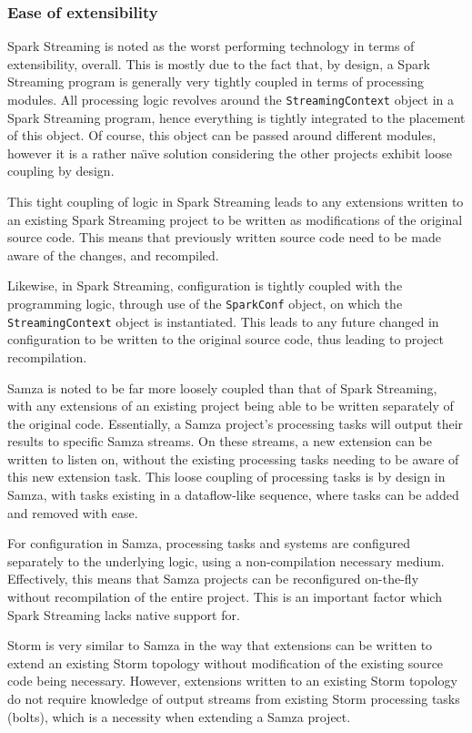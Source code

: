 \subsubsection{Ease of extensibility}

Spark Streaming is noted as the worst performing technology in terms of extensibility, overall. This is mostly due to
the fact that, by design, a Spark Streaming program is generally very tightly coupled in terms of processing modules.
All processing logic revolves around the \texttt{StreamingContext} object in a Spark Streaming program, hence everything is
tightly integrated to the placement of this object. Of course, this object can be passed around different modules, however
it is a rather na\"{\i}ve solution considering the other projects exhibit loose coupling by design.

This tight coupling of logic in Spark Streaming leads to any extensions written to an existing Spark Streaming project to
be written as modifications of the original source code. This means that previously written source code need to be made
aware of the changes, and recompiled.

Likewise, in Spark Streaming, configuration is tightly coupled with the programming logic, through use of the \texttt{SparkConf}
object, on which the \texttt{StreamingContext} object is instantiated. This leads to any future changed in configuration to be
written to the original source code, thus leading to project recompilation.

Samza is noted to be far more loosely coupled than that of Spark Streaming, with any extensions of an existing project
being able to be written separately of the original code. Essentially, a Samza project's processing tasks will output
their results to specific Samza streams. On these streams, a new extension can be written to listen on, without the
existing processing tasks needing to be aware of this new extension task. This loose coupling of processing tasks is
by design in Samza, with tasks existing in a dataflow-like sequence, where tasks can be added and removed with ease.

For configuration in Samza, processing tasks and systems are configured separately to the underlying logic, using a
non-compilation necessary medium. Effectively, this means that Samza projects can be reconfigured on-the-fly without
recompilation of the entire project. This is an important factor which Spark Streaming lacks native support for.

Storm is very similar to Samza in the way that extensions can be written to extend an existing Storm topology without
modification of the existing source code being necessary. However, extensions written to an existing Storm topology do not
require knowledge of output streams from existing Storm processing tasks (bolts), which is a necessity when extending a
Samza project.


